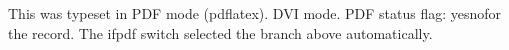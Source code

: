 \documentclass{article}
\begin{document}
\ifpdf This was typeset in PDF mode (pdflatex). \else DVI mode. \fi
PDF status flag: \ifpdf yes\else no\fi\space for the record.
The ifpdf switch selected the branch above automatically.
\end{document}
